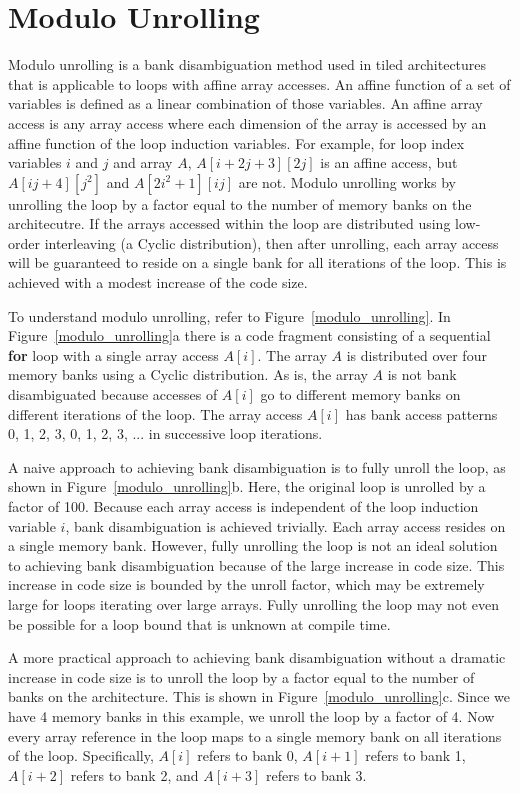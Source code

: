 \section{Modulo Unrolling}\label{sec:modulo_unrolling}

Modulo unrolling \cite{barua1999maps} is a bank disambiguation method used in tiled architectures that is applicable to loops with affine array accesses. An affine function of a set of variables is defined as a linear combination of those variables. An affine array access is any array access where each dimension of the array is accessed by an affine function of the loop induction variables. For example, for loop index variables $i$ and $j$ and array $A$,  $A[i+2j+3][2j]$ is an affine access, but $A[ij+4][j^2]$ and $A[2i^2+1][ij]$ are not. Modulo unrolling works by unrolling the loop by a factor equal to the number of memory banks on the architecutre. If the arrays accessed within the loop are distributed using low-order interleaving (a Cyclic distribution), then after unrolling, each array access will be guaranteed to reside on a single bank for all iterations of the loop. This is achieved with a modest increase of the code size. 

To understand modulo unrolling, refer to Figure~\ref{modulo_unrolling}. In Figure~\ref{modulo_unrolling}a there is a code fragment consisting of a sequential \textbf{for} loop with a single array access $A[i]$. The array $A$ is distributed over four memory banks using a Cyclic distribution. As is, the array $A$ is not bank disambiguated because accesses of $A[i]$ go to different memory banks on different iterations of the loop. The array access $A[i]$ has bank access patterns 0, 1, 2, 3, 0, 1, 2, 3, ... in successive loop iterations. 

A naive approach to achieving bank disambiguation is to fully unroll the loop, as shown in Figure~\ref{modulo_unrolling}b. Here, the original loop is unrolled by a factor of 100. Because each array access is independent of the loop induction variable $i$, bank disambiguation is achieved trivially. Each array access resides on a single memory bank. However, fully unrolling the loop is not an ideal solution to achieving bank disambiguation because of the large increase in code size. This increase in code size is bounded by the unroll factor, which may be extremely large for loops iterating over large arrays. Fully unrolling the loop may not even be possible for a loop bound that is unknown at compile time. 

A more practical approach to achieving bank disambiguation without a dramatic increase in code size is to unroll the loop by a factor equal to the number of banks on the architecture. This is shown in Figure~\ref{modulo_unrolling}c. Since we have 4 memory banks in this example, we unroll the loop by a factor of 4. Now every array reference in the loop maps to a single memory bank on all iterations of the loop. Specifically, $A[i]$ refers to bank 0, $A[i+1]$ refers to bank 1, $A[i+2]$ refers to bank 2, and $A[i+3]$ refers to bank 3.

